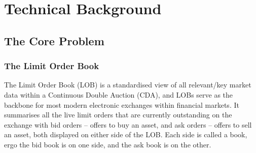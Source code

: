 \documentclass[ %
                    author={Ashwinder Khurana},
                supervisor={Prof Dave Cliff},
                    degree={MEng},
                     title={The Deeply Reinforced Trader},
                  subtitle={},
                      type={enterprise},
                      year={2020} ]{dissertation}
\begin{document}

\chapter{Technical Background}
\label{chap:technical}




%
\section{The Core Problem}
\vspace{0.5cm}
\subsection{The Limit Order Book}
\label{subsection:The Limit Order Book}
\label{Technical:LOB}
\vspace{0.5cm}
The Limit Order Book (LOB) is a standardised view of all relevant/key market data within a Continuous Double Auction (CDA), and LOBs serve as the backbone for most modern electronic exchanges within financial markets. It summarises all the live limit orders that are currently outstanding on the exchange with bid orders -- offers to buy an asset, and ask orders -- offers to sell an asset, both displayed on either side of the LOB. Each side is called a book, ergo the bid book is on one side, and the ask book is on the other. 
\end{document}
